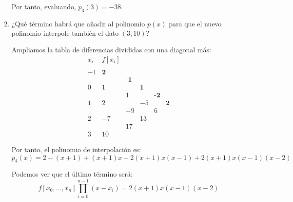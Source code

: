 \begin{ejercicio}
\begin{enumerate}
        Por tanto, evaluando, $p_3(3) = -38$.
        

        \item ¿Qué término habrá que añadir al polinomio $p(x)$ para que el nuevo polinomio interpole también el dato $(3, 10)$?

        Ampliamos la tabla de diferencias divididas con una diagonal más:
        \begin{equation*}
            \begin{array}{c|ccccc}
                x_i & f[x_i] \\
                \\
                -1 & \textbf{2} \\
                && \textbf{-1}\\
                0 & 1 & & \textbf{1}\\
                && 1 &&\textbf{-2}\\
                1 & 2 && -5 && \textbf{2}\\
                & & -9 && 6\\
                2 &-7 && 13 \\
                && 17\\
                3 & 10
            \end{array}
        \end{equation*}
        
        Por tanto, el polinomio de interpolación es:
        \begin{equation*}
            p_4(x) = 2-(x+1) +(x+1)x -2(x+1)x(x-1) +2(x+1)x(x-1)(x-2)
        \end{equation*}

        Podemos ver que el último término será:
        \begin{equation*}
            f[x_0,\dots, x_n]\prod_{i=0}^{n-1}(x-x_i) = 2(x+1)x(x-1)(x-2)
        \end{equation*}
    \end{enumerate}
\end{ejercicio}

